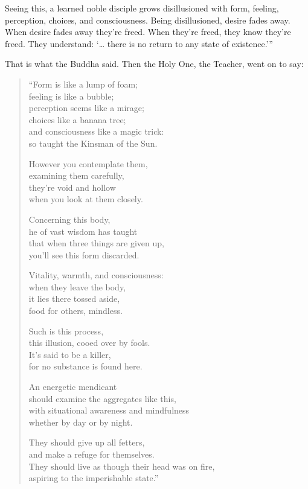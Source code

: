 \documentclass[12pt,openany]{book}%
\begin{document}
Seeing this, a learned noble disciple grows disillusioned with form, feeling, perception, choices, and consciousness. Being disillusioned, desire fades away. When desire fades away they’re freed. When they’re freed, they know they’re freed. They understand: ‘… there is no return to any state of existence.’” 

That is what the Buddha said. Then the Holy One, the Teacher, went on to say: 

\begin{verse}%
“Form is like a lump of foam; \\
feeling is like a bubble; \\
perception seems like a mirage; \\
choices like a banana tree; \\
and consciousness like a magic trick: \\
so taught the Kinsman of the Sun. 

However you contemplate them, \\
examining them carefully, \\
they’re void and hollow \\
when you look at them closely. 

Concerning this body, \\
he of vast wisdom has taught \\
that when three things are given up, \\
you’ll see this form discarded. 

Vitality, warmth, and consciousness: \\
when they leave the body, \\
it lies there tossed aside, \\
food for others, mindless. 

Such is this process, \\
this illusion, cooed over by fools. \\
It’s said to be a killer, \\
for no substance is found here. 

An energetic mendicant \\
should examine the aggregates like this, \\
with situational awareness and mindfulness \\
whether by day or by night. 

They should give up all fetters, \\
and make a refuge for themselves. \\
They should live as though their head was on fire, \\
aspiring to the imperishable state.” 

%
\end{verse}
\end{document}
